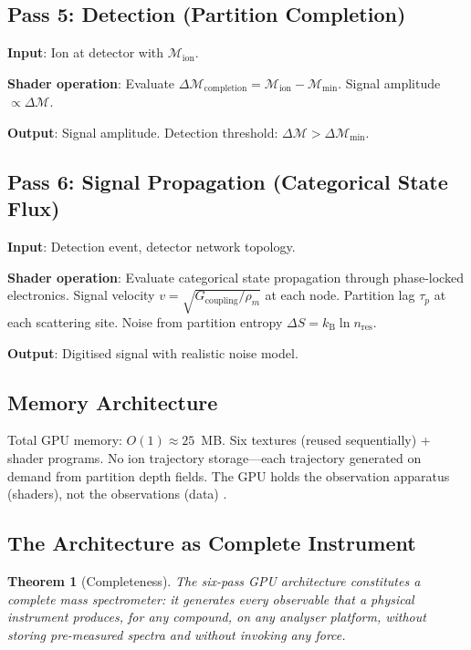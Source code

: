 \documentclass[11pt,twocolumn,a4paper]{article}
\newtheorem{theorem}{Theorem}[section]
\theoremstyle{definition}
\theoremstyle{remark}
\newcommand{\kB}{k_{\mathrm{B}}}
\newcommand{\Depth}{\mathcal{M}}
\newcommand{\taup}{\tau_p}
\begin{document}
\subsection{Pass 5: Detection (Partition Completion)}

\textbf{Input}: Ion at detector with $\Depth_{\mathrm{ion}}$.

\textbf{Shader operation}: Evaluate $\Delta\Depth_{\mathrm{completion}} = \Depth_{\mathrm{ion}} - \Depth_{\min}$. Signal amplitude $\propto \Delta\Depth$.

\textbf{Output}: Signal amplitude. Detection threshold: $\Delta\Depth > \Delta\Depth_{\min}$.

\subsection{Pass 6: Signal Propagation (Categorical State Flux)}

\textbf{Input}: Detection event, detector network topology.

\textbf{Shader operation}: Evaluate categorical state propagation through phase-locked electronics. Signal velocity $v = \sqrt{G_{\mathrm{coupling}}/\rho_m}$ at each node. Partition lag $\taup$ at each scattering site. Noise from partition entropy $\Delta S = \kB\ln n_{\mathrm{res}}$.

\textbf{Output}: Digitised signal with realistic noise model.

\subsection{Memory Architecture}

Total GPU memory: $O(1) \approx 25$~MB. Six textures (reused sequentially) + shader programs. No ion trajectory storage---each trajectory generated on demand from partition depth fields. The GPU holds the observation apparatus (shaders), not the observations (data) \citep{khronos2017}.

\subsection{The Architecture as Complete Instrument}

\begin{theorem}[Completeness]
\label{thm:completeness}
The six-pass GPU architecture constitutes a complete mass spectrometer: it generates every observable that a physical instrument produces, for any compound, on any analyser platform, without storing pre-measured spectra and without invoking any force.
\end{theorem}
\end{document}
